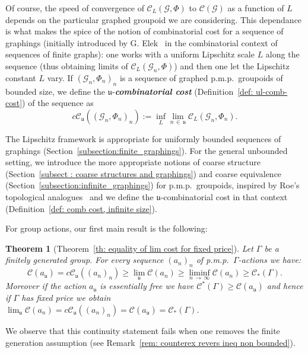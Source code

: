 \documentclass[10pt]{amsart}
\newtheorem{theo}[cdrthm]{Theorem}
\theoremstyle{definition}
\newcommand{\defin}[1]{\textbf{\emph{#1}}}
\newcommand{\cost}{\mathcal{C}}
\newcommand{\ccost}{c\mathcal{C}}
\newcommand{\cg}{\mathcal{G}}
\newcommand{\vraicost}{\mathscr{C}}
\newcommand{\ul}{\mathfrak{u}}
\newcommand{\pmp}{p.m.p.\ }
\begin{document}
Of course, the speed of convergence of $\cost_L(\cg,\Phi)$ to $\cost(\cg)$ as a function of $L$ depends on the particular graphed groupoid we are considering. This dependance is what makes the spice of the notion of combinatorial cost for a sequence of graphings (initially introduced by G. Elek~\cite{Elek-combinatorial-cost-2007} in the combinatorial context of sequences of finite graphs): one works with a uniform Lipschitz scale $L$ along the sequence (thus obtaining limits of $\cost_L(\cg_n,\Phi)$) and then one let the Lipschitz constant $L$ vary. If $(\cg_n,\Phi_n)_n$ is a sequence of graphed \pmp groupoids of bounded size, we define the $\ul$-\defin{combinatorial cost} (Definition~\ref{def: ul-comb-cost}) of the sequence as
\[
\ccost_\ul\left(\left(\cg_n,\Phi_n\right)_n\right):=\inf_L\lim_{n\,\in\,\ul}\cost_L\left(\cg_n,\Phi_n\right).
\]

The Lipschitz framework is appropriate for uniformly bounded sequences of graphings (Section~\ref{subsection:finite_graphings}). For the general unbounded setting, we introduce the more appropriate notions of coarse structure (Section~\ref{subsect : coarse structures and graphings}) and coarse equivalence (Section~\ref{subsection:infinite_graphings}) for \pmp groupoids, inspired by Roe's topological analogues~\cite{Roe-2003} and we define the $\ul$-combinatorial cost in that context (Definition~\ref{def: comb cost, infinite size}).



For group actions, our first main result is the following:
\begin{theo}[{Theorem~\ref{th: equality of lim cost for fixed price}}]\label{th-intro:equality of lim cost for fixed price}
Let $\Gamma$ be a finitely generated group. For every sequence $(a_n)_n$ of \pmp $\Gamma$-actions we have:
\begin{equation}
\cost(a_\ul)=\ccost_\ul\left((a_n)_n\right) \geq \lim_{\ul}\cost(a_{n})\geq \liminf_{n\,\to\,\infty}\cost(a_{n}) \geq \vraicost_*(\Gamma).
\end{equation}
Moreover if the action $a_\ul$ is essentially free we have $\vraicost^*(\Gamma)\geq \cost(a_\ul)$ and hence if $\Gamma$ has fixed price we obtain $\lim_\ul\cost(a_n)=\ccost_\ul((a_n)_n)=\cost(a_{\ul})=\vraicost_*(\Gamma)$.
\end{theo}

We observe that this continuity statement fails when one removes the finite generation assumption (see Remark~\ref{rem: counterex revers ineq non bounded}).
\end{document}
